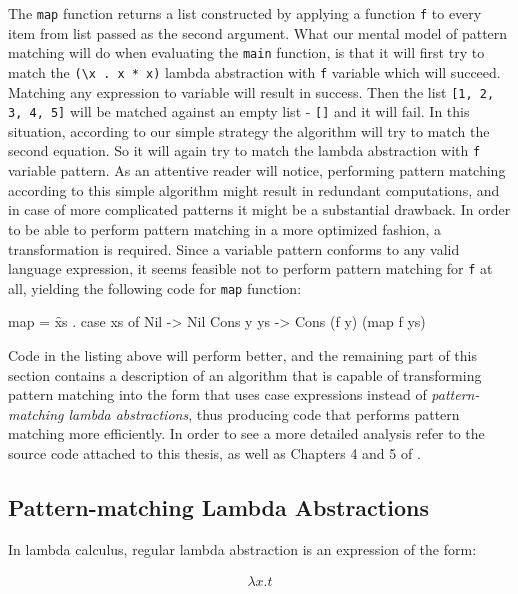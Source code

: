 \documentclass[12pt,a4paper]{report}
\begin{document}
The \texttt{map} function returns a list constructed by applying a function
\texttt{f} to every item from list passed as the second argument. What our
mental model of pattern matching will do when evaluating the \texttt{main}
function, is that it will first try to match the \texttt{(\textbackslash x . x
* x)} lambda abstraction with \texttt{f} variable which will succeed. Matching
any expression to variable will result in success. Then the list \texttt{[1, 2,
3, 4, 5]} will be matched against an empty list - \texttt{[]} and it will fail.
In this situation, according to our simple strategy the algorithm will try to
match the second equation. So it will again try to match the lambda abstraction
with \texttt{f} variable pattern. As an attentive reader will notice,
performing pattern matching according to this simple algorithm might result in
redundant computations, and in case of more complicated patterns it might be a
substantial drawback. In order to be able to perform pattern matching in a more
optimized fashion, a transformation is required. Since a variable pattern
conforms to any valid language expression, it seems feasible not to perform
pattern matching for \texttt{f} at all, yielding the following code for
\texttt{map} function:

\vspace*{0.2in}
\begin{code}[style=haskell,mathescape=true]
  map = \f xs .
      case xs of
          Nil       -> Nil
          Cons y ys -> Cons (f y) (map f ys)
\end{code}

Code in the listing above will perform better, and the remaining part of this
section contains a description of an algorithm that is capable of transforming
pattern matching into the form that uses case expressions instead of
\textit{pattern-matching lambda abstractions}, thus producing code that
performs pattern matching more efficiently. In order to see a more detailed
analysis refer to the source code attached to this thesis, as well as Chapters
4 and 5 of \cite{Jon87}.

\subsection{Pattern-matching Lambda Abstractions}
In lambda calculus, regular lambda abstraction is an expression of the form:

\vspace{-0.2in}
\begin{align*}
\lambda x.t
\end{align*}
\end{document}
